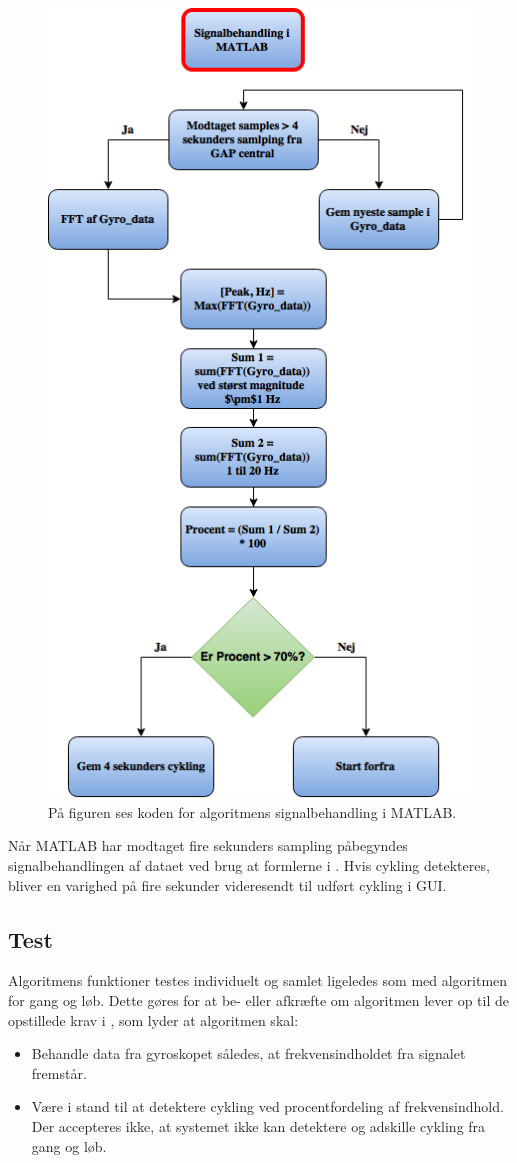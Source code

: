 \begin{figure}[H]
	\centering
	\includegraphics[scale=0.4]{figures/cDesign/algoritme_matlab_cykling.png}
	\caption{På figuren ses koden for algoritmens signalbehandling i MATLAB.}
	\label{fig:matlab_cykling}
\end{figure} 
Når MATLAB har modtaget fire sekunders sampling påbegyndes signalbehandlingen af dataet ved brug at formlerne i . Hvis cykling detekteres, bliver en varighed på fire sekunder videresendt til udført cykling i GUI. 


\subsection{Test}
Algoritmens funktioner testes individuelt og samlet ligeledes som med algoritmen for gang og løb. Dette gøres for at be- eller afkræfte om algoritmen lever op til de opstillede krav i , som lyder at algoritmen skal:
\begin{itemize}
	\item Behandle data fra gyroskopet således, at frekvensindholdet fra signalet fremstår.
	\item Være i stand til at detektere cykling ved procentfordeling af frekvensindhold. Der accepteres ikke, at systemet ikke kan detektere og adskille cykling fra gang og løb.
\end{itemize}

